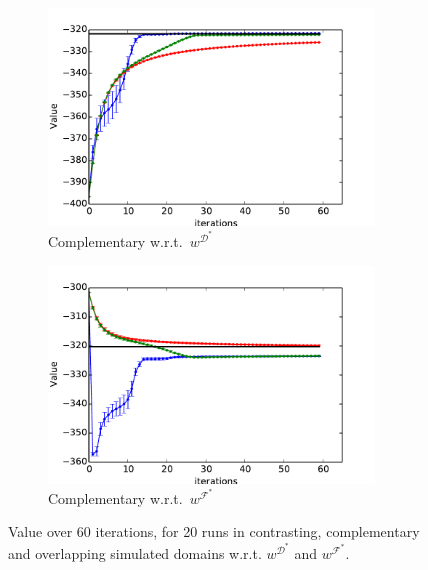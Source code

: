 \documentclass[a4paper,11pt]{report}
\begin{document}
\begin{figure}[h!]
\begin{subfigure}[t]{0.49\columnwidth}
    \includegraphics[trim=0.6cm 0.0cm 0.0cm 0.0cm,clip=true,width=0.95\textwidth]{figures/expert_apprentice_complementary.pdf}
    \caption{Complementary w.r.t.\ $w^{\mathcal{D}^*}$}
    \label{fig:toy_expert_apprentice_complementary}
    \end{subfigure}
    \begin{subfigure}[t]{0.49\columnwidth}
       \hspace{2mm}
    \includegraphics[trim=0.6cm 0.0cm 0.0cm 0.0cm,clip=true,width=0.95\textwidth]{figures/taboo_apprentice_complementary.pdf}
     \caption{Complementary w.r.t.\ $w^{\mathcal{F}^*}$}
    \label{fig:toy_taboo_apprentice_complementary}
    \end{subfigure}
  \caption{Value over 60 iterations, for 20 runs in contrasting, complementary and overlapping simulated domains w.r.t. $w^{\mathcal{D}^*}$ and $w^{\mathcal{F}^*}$.}
  \label{fig:complementary}

\end{figure}
\end{document}
